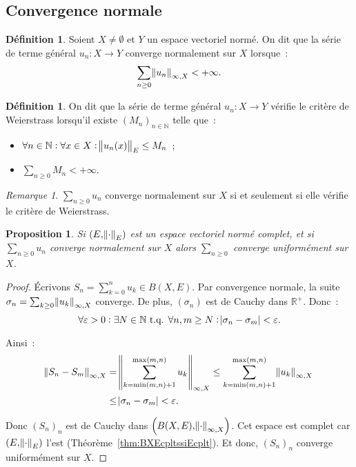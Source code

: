 \documentclass{report}
\newtheorem{prp}[thm]{Proposition}
\theoremstyle{definition}
\newtheorem{déf}[thm]{Définition}
\theoremstyle{remark}
\newtheorem*{rmq}{Remarque}
\numberwithin{equation}{section}
\newcommand{\R}{\mathbb R}
\newcommand{\Rp}{\R^{+}}
\newcommand{\N}{\mathbb N}
\newcommand{\tq}{\text{ t.q. }}
\newcommand{\seq}[3]{\left(#1_{#2}\right)_{#2 \in #3}}
\newcommand{\pinfty}{{+\infty}}
\newcommand{\evn}{espace vectoriel normé}
\newcommand{\evnc}{{\evn} complet}
\begin{document}
		\subsection{Convergence normale}
			\begin{déf} Soient $X \neq \emptyset$ et $Y$ un \evn. On dit que la série de terme général $u_n : X \to Y$ converge normalement sur $X$ lorsque~:
			\begin{equation}
				\sum_{n \geq 0}\norm {u_n}_{\infty, X} < \pinfty.
			\end{equation}
			\end{déf}

			\begin{déf} On dit que la série de terme général $u_n : X \to Y$ vérifie le critère de Weierstrass lorsqu'il existe $\seq Mn\N$ telle que~:
			\begin{itemize}
				\item $\displaystyle \forall n \in \N : \forall x \in X : \norm {u_n(x)}_E \leq M_n$~;
				\item $\displaystyle \sum_{n \geq 0}M_n < \pinfty$.
			\end{itemize}
			\end{déf}

			\begin{rmq} $\sum_{n \geq 0}u_n$ converge normalement sur $X$ si et seulement si elle vérifie le critère de Weierstrass.
			\end{rmq}

			\begin{prp} Si $(E, \norm \cdot_E)$ est un \evnc, et si $\sum_{n \geq 0}u_n$ converge normalement sur $X$ alors $\sum_{n \geq 0}$
			converge uniformément sur $X$.
			\end{prp}

			\begin{proof} Écrivons $S_n = \sum_{k=0}^nu_k \in B(X, E)$. Par convergence normale, la suite $\sigma_n = \sum_{k \geq 0}\norm {u_k}_{\infty, X}$
			converge. De plus, $(\sigma_n)$ est de Cauchy dans $\Rp$. Donc~:
			\begin{equation}
				\forall \varepsilon > 0 : \exists N \in \N \tq \forall n, m \geq N : \abs {\sigma_n - \sigma_m} < \varepsilon.
			\end{equation}

			Ainsi~:
			\begin{align}
				\norm {S_n - S_m}_{\infty, X} &= \norm {\sum_{k=\min(m, n)+1}^{\max(m, n)}u_k}_{\infty, X} \leq \sum_{k=\min(m, n)+1}^{\max(m, n)}\norm {u_k}_{\infty, X} \\
				&\leq \abs {\sigma_n - \sigma_m} < \varepsilon.
			\end{align}

			Donc $(S_n)_n$ est de Cauchy dans $\left(B(X, E), \norm \cdot_{\infty, X}\right)$. Cet espace est complet car $(E, \norm \cdot_E)$ l'est
			(Théorème~\ref{thm:BXEcpltssiEcplt}). Et donc, $(S_n)_n$ converge uniformément sur $X$.
			\end{proof}
\end{document}
